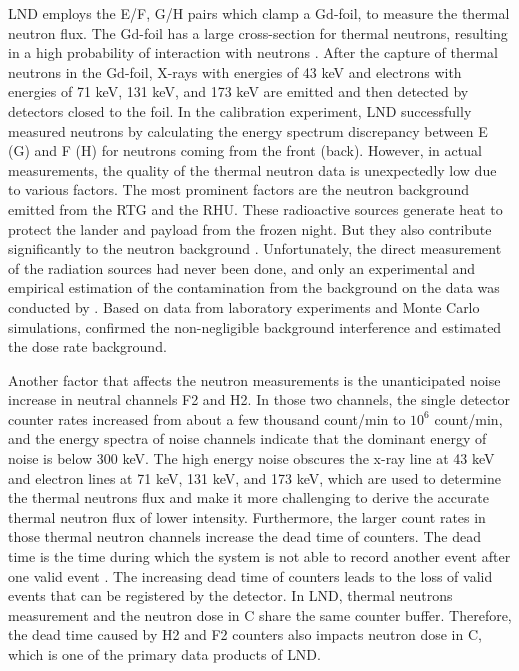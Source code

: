 \ac{LND} employs the E/F, G/H pairs which clamp a Gd-foil, to measure the thermal neutron flux. The Gd-foil has a large cross-section for thermal neutrons, resulting in a high probability of interaction with neutrons \citep{Wimmer2020SSRv}. After the capture of thermal neutrons in the Gd-foil, X-rays with energies of 43 keV and electrons with energies of 71 keV, 131 keV, and 173 keV are emitted and then detected by detectors closed to the foil.
In the calibration experiment, \ac{LND} successfully measured neutrons by calculating the energy spectrum discrepancy between E (G) and F (H) for neutrons coming from the front (back).
However, in actual measurements, the quality of the thermal neutron data is unexpectedly low due to various factors. The most prominent factors are the neutron background emitted from the \ac{RTG} and the \ac{RHU}. These radioactive sources generate heat to protect the lander and payload from the frozen night. But they also contribute significantly to the neutron background \citep{Zhang2020SciAdv}. Unfortunately, the direct measurement of the radiation sources had never been done, and only an experimental and empirical estimation of the contamination from the background on the data was conducted by \citet{Hou2020-LNDbackground}. Based on data from laboratory experiments and Monte Carlo simulations, \citet{Hou2020-LNDbackground} confirmed the non-negligible background interference and estimated the dose rate background. 

Another factor that affects the neutron measurements is the unanticipated noise increase in neutral channels F2 and H2. In those two channels, the single detector counter rates increased from about a few thousand count/min to $10^6$ count/min, and the energy spectra of noise channels indicate that the dominant energy of noise is below 300 keV. 
The high energy noise obscures the x-ray line at 43 keV and electron lines at 71 keV, 131 keV, and 173 keV, which are used to determine the thermal neutrons flux and make it more challenging to derive the accurate thermal neutron flux of lower intensity.
Furthermore, the larger count rates in those thermal neutron channels increase the dead time of counters. The dead time is the time during which the system is not able to record another event after one valid event \citep{leo1994techniques}. The increasing dead time of counters leads to the loss of valid events that can be registered by the detector. In \ac{LND}, thermal neutrons measurement and the neutron dose in C share the same counter buffer. Therefore, the dead time caused by H2 and F2 counters also impacts neutron dose in C, which is one of the primary data products of \ac{LND}.

